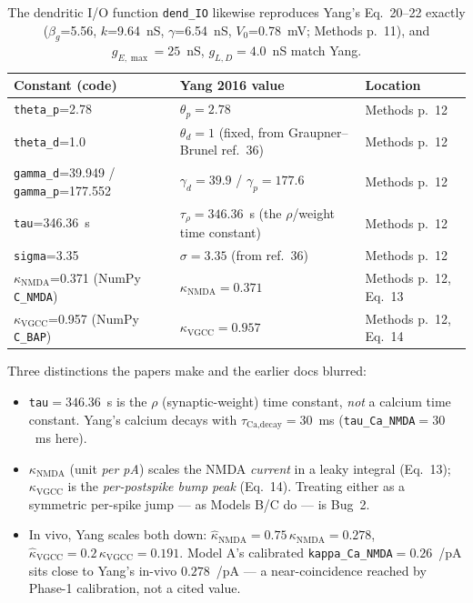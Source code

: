 \documentclass[11pt,a4paper]{article}
\begin{document}
\begin{table}[H]
    \centering
    \small
    \begin{tabular}{@{}lll@{}}
    \toprule
    \textbf{Constant (code)} & \textbf{Yang 2016 value} & \textbf{Location} \\ \midrule
    \texttt{theta\_p}=2.78 & $\theta_p=2.78$ & Methods p.~12 \\
    \texttt{theta\_d}=1.0 & $\theta_d=1$ (fixed, from Graupner--Brunel ref.~36) & Methods p.~12 \\
    \texttt{gamma\_d}=39.949 / \texttt{gamma\_p}=177.552 & $\gamma_d=39.9$ / $\gamma_p=177.6$ & Methods p.~12 \\
    \texttt{tau}=346.36~s & $\tau_\rho=346.36$~s (the $\rho$/weight time constant) & Methods p.~12 \\
    \texttt{sigma}=3.35 & $\sigma=3.35$ (from ref.~36) & Methods p.~12 \\
    $\kappa_{\text{NMDA}}$=0.371 (NumPy \texttt{C\_NMDA}) & $\kappa_{\text{NMDA}}=0.371$ & Methods p.~12, Eq.~13 \\
    $\kappa_{\text{VGCC}}$=0.957 (NumPy \texttt{C\_BAP}) & $\kappa_{\text{VGCC}}=0.957$ & Methods p.~12, Eq.~14 \\
    \bottomrule
    \end{tabular}
    \caption{The dendritic I/O function \texttt{dend\_IO} likewise reproduces Yang's
    Eq.~20--22 exactly ($\beta_g$=5.56, $k$=9.64~nS, $\gamma$=6.54~nS, $V_0$=0.78~mV;
    Methods p.~11), and $g_{E,\max}=25$~nS, $g_{L,D}=4.0$~nS match Yang.}
\end{table}

Three distinctions the papers make and the earlier docs blurred:
\begin{itemize}
    \item \texttt{tau}$=346.36$~s is the $\rho$ (synaptic-weight) time constant, \emph{not}
      a calcium time constant. Yang's calcium decays with $\tau_{\text{Ca,decay}}=30$~ms
      (\texttt{tau\_Ca\_NMDA}$=30$~ms here).
    \item $\kappa_{\text{NMDA}}$ (unit \emph{per pA}) scales the NMDA \emph{current} in a
      leaky integral (Eq.~13); $\kappa_{\text{VGCC}}$ is the \emph{per-postspike bump peak}
      (Eq.~14). Treating either as a symmetric per-spike jump --- as Models B/C do --- is
      Bug~2.
    \item In vivo, Yang scales both down: $\hat\kappa_{\text{NMDA}}=0.75\,\kappa_{\text{NMDA}}
      =0.278$, $\hat\kappa_{\text{VGCC}}=0.2\,\kappa_{\text{VGCC}}=0.191$. Model A's
      calibrated \texttt{kappa\_Ca\_NMDA}$=0.26$~/pA sits close to Yang's in-vivo
      $0.278$~/pA --- a near-coincidence reached by Phase-1 calibration, not a cited value.
\end{itemize}
\end{document}
